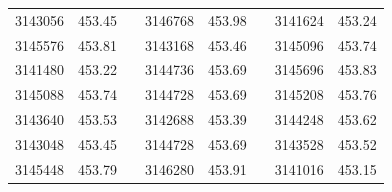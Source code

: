 \documentclass[12pt]{mwart}
\begin{document}
\begin{table}[H]
\begin{tabular}{cclcclcc}
		3143056                                                  & 453.45                                                        &  & 3146768                                                  & 453.98                                                        &  & 3141624                                                  & 453.24                                                        \\
		3145576                                                  & 453.81                                                        &  & 3143168                                                  & 453.46                                                        &  & 3145096                                                  & 453.74                                                        \\
		3141480                                                  & 453.22                                                        &  & 3144736                                                  & 453.69                                                        &  & 3145696                                                  & 453.83                                                        \\
		3145088                                                  & 453.74                                                        &  & 3144728                                                  & 453.69                                                        &  & 3145208                                                  & 453.76                                                        \\
		3143640                                                  & 453.53                                                        &  & 3142688                                                  & 453.39                                                        &  & 3144248                                                  & 453.62                                                        \\
		3143048                                                  & 453.45                                                        &  & 3144728                                                  & 453.69                                                        &  & 3143528                                                  & 453.52                                                        \\
		3145448                                                  & 453.79                                                        &  & 3146280                                                  & 453.91                                                        &  & 3141016                                                  & 453.15                                                        \\

\end{tabular}
\end{table}
\end{document}
